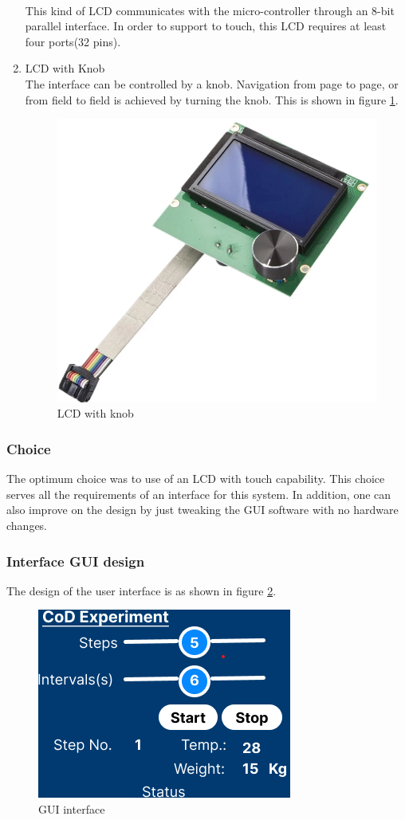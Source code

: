 \begin{enumerate}
    \\
     This kind of LCD communicates with the micro-controller through an 8-bit parallel interface. In order to support to touch, this LCD requires at least four ports(32 pins). 
    \item LCD with Knob \\
    The interface can be controlled by a knob. Navigation from page to page, or from field to field is achieved by turning the knob. This is shown in figure \ref{fig:lcd_with_knobs}.
    \begin{figure}[H]
        \centering
        \includegraphics[width=0.6\linewidth]{Figures/lcdwithknob.png}
        \caption[Lcd with knob]{LCD with knob \cite{noauthor_prusa_nodate}}
        \label{fig:lcd_with_knobs}
    \end{figure}
\end{enumerate}
\subsubsection{Choice}

 The optimum choice was to use of an LCD with touch capability. This choice serves all the requirements of an interface for this system. In addition, one can also improve on the design by just tweaking the GUI software with no hardware changes.

\clearpage
\subsubsection{Interface GUI design}
The design of the user interface is as shown in figure \ref{fig:GUI_interface}.
\begin{figure}[H]
    \centering
    \includegraphics{Figures/interfacedesign.png}
    \caption{GUI interface}
    \label{fig:GUI_interface}
\end{figure}

